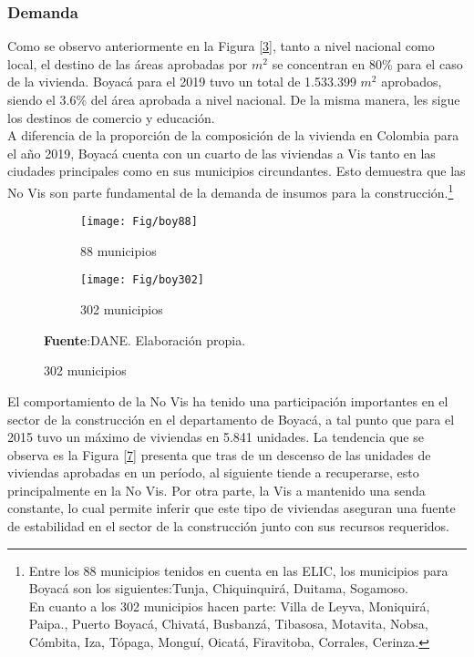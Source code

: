 \documentclass[12pt]{article}
\begin{document}
	\subsubsection{Demanda}
Como se observo anteriormente en la Figura \ref{3}, tanto a nivel nacional como local, el destino de las áreas aprobadas por $m^2$ se concentran en 80\% para el caso de la vivienda. Boyacá para el 2019 tuvo un total de 1.533.399 $m^2$ aprobados, siendo el 3.6\%  del área aprobada a nivel nacional. De la misma manera, les sigue los destinos de comercio y educación.\\

A diferencia de la proporción de la composición de la  vivienda en Colombia para el año 2019, Boyacá cuenta con un cuarto de las viviendas a Vis tanto en las ciudades principales como en sus municipios circundantes. Esto demuestra que las  No Vis son parte fundamental de la demanda de insumos para la construcción.\footnote{Entre los 88 municipios tenidos en cuenta en las ELIC, los municipios para Boyacá son los siguientes:Tunja, Chiquinquirá, Duitama, Sogamoso.\\
 En cuanto a los 302 municipios hacen parte: Villa de Leyva, Moniquirá, Paipa., Puerto Boyacá, Chivatá, Busbanzá, Tibasosa, Motavita, Nobsa, Cómbita, Iza, Tópaga, Monguí, Oicatá, Firavitoba, Corrales, Cerinza.} 

\begin{figure}[H]
\caption{Composición de la vivienda en Boyacá en el 2019}
\begin{subfigure}{0.48\textwidth}
  \centering
	\texttt{[image: Fig/boy88]} 
  \caption{88 municipios}
  \label{A11}
\end{subfigure}
\begin{subfigure}{0.48\textwidth}
  \centering
	\texttt{[image: Fig/boy302]} 
  \caption{302 municipios}
  \label{A12}
\end{subfigure}
\raggedright  \scriptsize \textbf{Fuente}:DANE. Elaboración propia.
	\label{A1}	
\end{figure}	

El comportamiento de la No Vis ha tenido una participación importantes en el sector de la construcción en el departamento de Boyacá, a tal punto que para el 2015 tuvo un máximo de viviendas en 5.841 unidades. La tendencia que se observa es la Figura \ref{7} presenta que tras de un descenso de las unidades de viviendas aprobadas en un período, al siguiente tiende a recuperarse, esto principalmente en la No Vis. Por otra parte, la Vis a mantenido una senda constante, lo cual permite inferir que este tipo de viviendas aseguran una fuente de estabilidad en el sector de la construcción junto con sus recursos requeridos.
\end{document}
